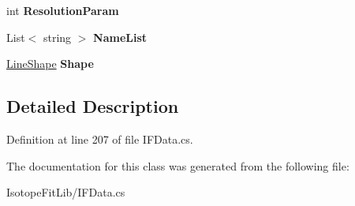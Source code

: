 \begin{DoxyCompactItemize}
int {\bfseries Resolution\+Param}
\item 
\mbox{\label{class_isotope_fit_1_1_i_f_data_1_1_calibration_a2e347f087df878f22010302bda7db4be}} 
List$<$ string $>$ {\bfseries Name\+List}
\item 
\mbox{\label{class_isotope_fit_1_1_i_f_data_1_1_calibration_ad0c3e0969448ad0cc57307c77c2222eb}} 
\hyperlink{class_isotope_fit_1_1_i_f_data_1_1_calibration_1_1_line_shape}{Line\+Shape} {\bfseries Shape}
\end{DoxyCompactItemize}


\subsection{Detailed Description}


Definition at line 207 of file I\+F\+Data.\+cs.



The documentation for this class was generated from the following file\+:\begin{DoxyCompactItemize}
\item 
Isotope\+Fit\+Lib/I\+F\+Data.\+cs\end{DoxyCompactItemize}
